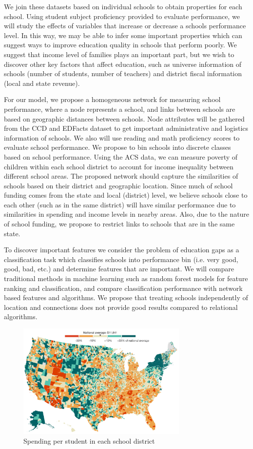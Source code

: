 We join these datasets based on individual schools to obtain properties for each school. Using student subject proficiency provided to evaluate performance, we will study the effects of variables that increase or decrease a schools performance level. In this way, we may be able to infer some important properties which can suggest ways to improve education quality in schools that perform poorly. We suggest that income level of families plays an important part, but we wish to discover other key factors that affect education, such as universe information of schools (number of students, number of teachers) and district fiscal information (local and state revenue).

For our model, we propose a homogeneous network for measuring school performance, where a node represents a school, and links between schools are based on geographic distances between schools. Node attributes will be gathered from the CCD and EDFacts dataset to get important administrative and logistics information of schools. We also will use reading and math proficiency scores to evaluate school performance. We propose to bin schools into discrete classes based on school performance. Using the ACS data, we can measure poverty of children within each school district to account for income inequality between different school areas. The proposed network should capture the similarities of schools based on their district and geographic location. Since much of school funding comes from the state and local (district) level, we believe schools close to each other (such as in the same district) will have similar performance due to similarities in spending and income levels in nearby areas. Also, due to the nature of school funding, we propose to restrict links to schools that are in the same state.

To discover important features we consider the problem of education gaps as a classification task which classifies schools into performance bin (i.e. very good, good, bad, etc.) and determine features that are important. We will compare traditional methods in machine learning such as random forest models for feature ranking and classification, and compare classification performance with network based features and algorithms. We propose that treating schools independently of location and connections does not provide good results compared to relational algorithms.

\begin{figure} 
	\includegraphics[width=8.45cm]{images/spending2016.png}
	\caption{Spending per student in each school district}
	\label{fig:spending}
\end{figure}

